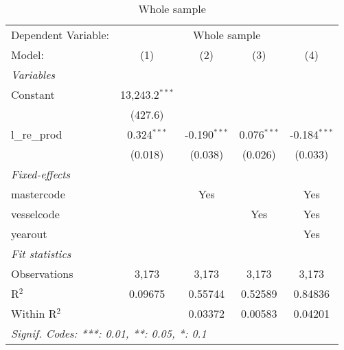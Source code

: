 
\begin{table}[htbp]
   \caption{\label{tab:n_voyage} Whole sample}
   \centering
   \begin{tabular}{lcccc}
      \tabularnewline \midrule \midrule
      Dependent Variable: & \multicolumn{4}{c}{Whole sample }\\
      Model:        & (1)              & (2)            & (3)           & (4)\\  
      \midrule
      \emph{Variables}\\
      Constant      & 13,243.2$^{***}$ &                &               &   \\   
                    & (427.6)          &                &               &   \\   
      l\_re\_prod   & 0.324$^{***}$    & -0.190$^{***}$ & 0.076$^{***}$ & -0.184$^{***}$\\   
                    & (0.018)          & (0.038)        & (0.026)       & (0.033)\\   
      \midrule
      \emph{Fixed-effects}\\
      mastercode    &                  & Yes            &               & Yes\\  
      vesselcode    &                  &                & Yes           & Yes\\  
      yearout       &                  &                &               & Yes\\  
      \midrule
      \emph{Fit statistics}\\
      Observations  & 3,173            & 3,173          & 3,173         & 3,173\\  
      R$^2$         & 0.09675          & 0.55744        & 0.52589       & 0.84836\\  
      Within R$^2$  &                  & 0.03372        & 0.00583       & 0.04201\\  
      \midrule \midrule
      \multicolumn{5}{l}{\emph{Signif. Codes: ***: 0.01, **: 0.05, *: 0.1}}\\
   \end{tabular}
\end{table}



